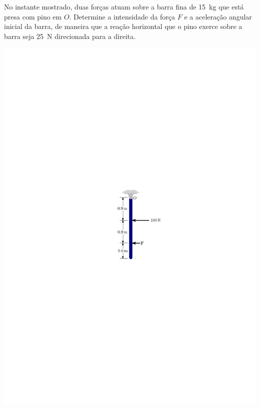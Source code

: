 \begin{minipage}{.6\linewidth}
	\vspace{-4cm}
	\item No instante mostrado, duas forças atuam sobre a barra fina de \SI{15}{\kilogram} que está presa com pino em $O$. Determine a intensidade da força $F$ e a aceleração angular inicial da barra, de maneira que a reação horizontal que o pino exerce sobre a barra seja \SI{25}{\newton} direcionada para a direita.
\end{minipage}
\begin{minipage}{.4\linewidth}
	\vspace{1cm}
	\begin{flushright}
		\includegraphics[scale=1.3]{../../images/draw_9}
	\end{flushright}
\end{minipage}

